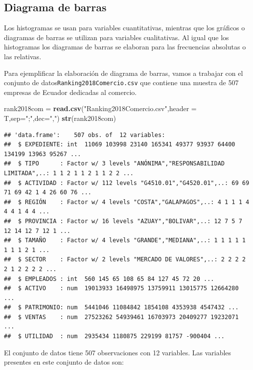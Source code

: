 \documentclass[]{book}
\newenvironment{Shaded}{\begin{snugshade}}{\end{snugshade}}
\newcommand{\DataTypeTok}[1]{\textcolor[rgb]{0.13,0.29,0.53}{#1}}
\newcommand{\KeywordTok}[1]{\textcolor[rgb]{0.13,0.29,0.53}{\textbf{#1}}}
\newcommand{\NormalTok}[1]{#1}
\newcommand{\StringTok}[1]{\textcolor[rgb]{0.31,0.60,0.02}{#1}}
\begin{document}
\hypertarget{diagrama-de-barras}{%
\subsection{Diagrama de barras}\label{diagrama-de-barras}}

Los histogramas se usan para variables cuantitativas, mientras que los gráficos o diagramas de barras se utilizan para variables cualitativas. Al igual que los histogramas los diagramas de barras se elaboran para las frecuencias absolutas o las relativas.

Para ejemplificar la elaboración de diagrama de barras, vamos a trabajar con el conjunto de datos\texttt{Ranking2018Comercio.csv} que contiene una muestra de 507 empresas de Ecuador dedicadas al comercio.

\begin{Shaded}
\begin{Highlighting}[]
\NormalTok{rank2018com =}\StringTok{ }\KeywordTok{read.csv}\NormalTok{(}\StringTok{"Ranking2018Comercio.csv"}\NormalTok{,}\DataTypeTok{header =}\NormalTok{ T,}\DataTypeTok{sep=}\StringTok{";"}\NormalTok{,}\DataTypeTok{dec=}\StringTok{","}\NormalTok{)}
\KeywordTok{str}\NormalTok{(rank2018com)}
\end{Highlighting}
\end{Shaded}

\begin{verbatim}
## 'data.frame':    507 obs. of  12 variables:
##  $ EXPEDIENTE: int  11069 103998 23140 165341 49377 93937 64400 134199 13963 95267 ...
##  $ TIPO      : Factor w/ 3 levels "ANÓNIMA","RESPONSABILIDAD LIMITADA",..: 1 1 2 1 1 2 1 1 2 2 ...
##  $ ACTIVIDAD : Factor w/ 112 levels "G4510.01","G4520.01",..: 69 69 71 69 42 1 4 26 60 76 ...
##  $ REGIÓN    : Factor w/ 4 levels "COSTA","GALAPAGOS",..: 4 1 1 1 4 4 4 1 4 4 ...
##  $ PROVINCIA : Factor w/ 16 levels "AZUAY","BOLIVAR",..: 12 7 5 7 12 14 12 7 12 1 ...
##  $ TAMAÑO    : Factor w/ 4 levels "GRANDE","MEDIANA",..: 1 1 1 1 1 1 1 1 2 1 ...
##  $ SECTOR    : Factor w/ 2 levels "MERCADO DE VALORES",..: 2 2 2 2 2 1 2 2 2 2 ...
##  $ EMPLEADOS : int  560 145 65 108 65 84 127 45 72 20 ...
##  $ ACTIVO    : num  19013933 16498975 13759911 13015775 12664280 ...
##  $ PATRIMONIO: num  5441046 11084842 1854108 4353938 4547432 ...
##  $ VENTAS    : num  27523262 54939461 16703973 20409277 19232071 ...
##  $ UTILIDAD  : num  2935434 1180875 229199 81757 -900404 ...
\end{verbatim}

El conjunto de datos tiene 507 observaciones con 12 variables. Las variables presentes en este conjunto de datos son:
\end{document}
